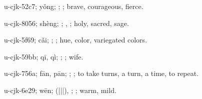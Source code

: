 \begin{multicols}{2}
{\cjkgGlue{}u-cjk-52c7; yǒng; \cjkgGlue{}\cjkgGlue{}\cjkgGlue{}; \cjkgGlue{}; brave, courageous, fierce.

\cjkgGlue{}u-cjk-8056; shèng; \cjkgGlue{}; \cjkgGlue{}, \cjkgGlue{}; holy, sacred, sage.

\cjkgGlue{}u-cjk-5f69; cǎi; \cjkgGlue{}\cjkgGlue{}\cjkgGlue{}; \cjkgGlue{}; hue, color, variegated colors.

\cjkgGlue{}u-cjk-59bb; qī, qì; \cjkgGlue{}; \cjkgGlue{}; wife.

\cjkgGlue{}u-cjk-756a; fān, pān; \cjkgGlue{}\cjkgGlue{}\cjkgGlue{}; \cjkgGlue{}; to take turns, a turn, a time, to repeat.

\cjkgGlue{}u-cjk-6e29; wēn; \cjkgGlue{}\cjkgGlue{}(\cjkgGlue{}|\cjkgGlue{}|\cjkgGlue{}|\cjkgGlue{}), \cjkgGlue{}; \cjkgGlue{}; warm, mild.

}
\end{multicols}
